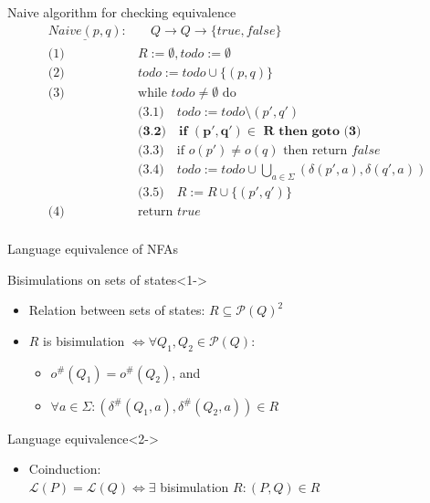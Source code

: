 \documentclass[compress]{beamer}
\begin{document}
\begin{frame}{Naive algorithm for checking equivalence}
  \begin{align*}
    \underline{Naive(p, q)}: &\quad Q \to Q \to \{true, false\} \\
    \text{(1) } & R := \emptyset, todo := \emptyset \\
    \text{(2) } & todo := todo \cup \{(p, q)\} \\
    \text{(3) } & \text{while } todo \neq \emptyset \text{ do}\\
      & \text{(3.1)}\quad todo := todo \setminus (p', q')\\
      & \textbf{(3.2)}\quad \textbf{if } \mathbf{(p', q') \in} \textbf{ R} \textbf{ then goto (3)}\\
      & \text{(3.3)}\quad \text{if } o(p') \neq o(q) \text{ then return } false\\
      & \text{(3.4)}\quad todo := todo \cup \bigcup_{a \in \Sigma}{(\delta(p', a), \delta(q', a))}\\
      & \text{(3.5)}\quad R := R \cup \{(p', q')\} \\
    \text{(4) } & \text{return } true\\
  \end{align*}
\end{frame}

\begin{frame}{Language equivalence of NFAs}
  \begin{block}{Bisimulations on sets of states}<1->
    \begin{itemize}
      \item Relation between sets of states: $R \subseteq \mathcal{P}(Q)^2$%
      \item $R$ is bisimulation $\Leftrightarrow \forall Q_1, Q_2 \in \mathcal{P}(Q): $
        \begin{itemize}
          \item $o^\#(Q_1) = o^\#(Q_2)$, and
          \item $\forall a \in \Sigma: (\delta^\#(Q_1, a), \delta^\#(Q_2, a)) \in R$
        \end{itemize}
    \end{itemize}
  \end{block}

  \begin{block}{Language equivalence}<2->
    \begin{itemize}
      \item
      Coinduction:\\
        $\mathcal{L}(P) = \mathcal{L}(Q) \Leftrightarrow \exists$ bisimulation $R: (P, Q) \in R$
    \end{itemize}
  \end{block}
\end{frame}
\end{document}
